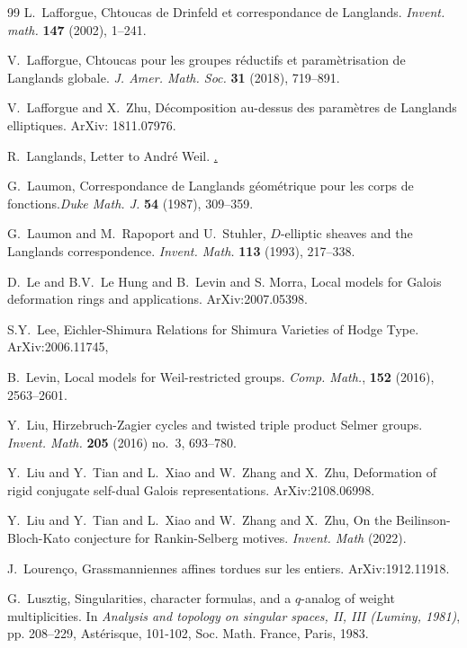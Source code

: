 \begin{thebibliography}{99}
L.~Lafforgue, Chtoucas de Drinfeld et correspondance de Langlands. \emph{Invent. math.} \textbf{147} (2002), 1--241.

V.~Lafforgue, Chtoucas pour les groupes r\'eductifs et param\`etrisation de Langlands globale. \emph{J. Amer. Math. Soc.} \textbf{31} (2018), 719--891.

V.~Lafforgue and X.~Zhu, D\'ecomposition au-dessus des param\`etres de Langlands elliptiques. ArXiv: 1811.07976.

R.~Langlands, Letter to Andr\'e Weil. \href{publications.ias.edu/rpl/paper/43}.

G.~Laumon, Correspondance de Langlands g\'eom\'etrique pour les corps de fonctions.\emph{Duke Math. J.} \textbf{54} (1987), 309--359.

G.~Laumon and M.~Rapoport and U.~Stuhler, $D$-elliptic sheaves and the Langlands correspondence. \emph{Invent. Math.} \textbf{113} (1993), 217--338.

D.~Le and B.V.~Le Hung and B.~Levin and S. Morra, Local models for Galois deformation rings and applications. ArXiv:2007.05398.

S.Y.~Lee, Eichler-Shimura Relations for Shimura Varieties of Hodge Type. ArXiv:2006.11745,

B.~Levin, Local models for Weil-restricted groups. \emph{Comp. Math.}, \textbf{152} (2016), 2563--2601.

Y.~Liu, Hirzebruch-Zagier cycles and twisted triple product Selmer groups. \emph{Invent. Math.} \textbf{205} (2016) no.~3, 693--780.

Y.~Liu and Y.~Tian and L.~Xiao and W.~Zhang and X.~Zhu, Deformation of rigid conjugate self-dual Galois representations. ArXiv:2108.06998.

Y.~Liu and Y.~Tian and L.~Xiao and W.~Zhang and X.~Zhu, On the Beilinson-Bloch-Kato conjecture for Rankin-Selberg motives. \emph{Invent. Math} (2022).

J.~Louren\c{c}o, Grassmanniennes affines tordues sur les entiers. ArXiv:1912.11918.

G.~Lusztig, Singularities, character formulas, and a $q$-analog of weight multiplicities. In \emph{Analysis and topology on singular spaces, II, III (Luminy, 1981)}, pp. 208--229, Ast\'erisque, 101-102, Soc. Math. France, Paris, 1983.


\end{thebibliography}
